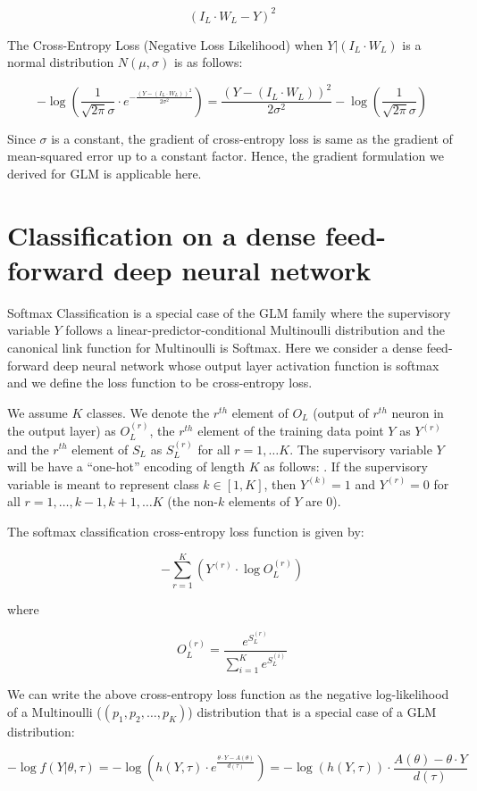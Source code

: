 \documentclass[10pt]{amsart}
\begin{document}
$$(I_L \cdot W_L - Y)^2$$

The Cross-Entropy Loss (Negative Loss Likelihood) when $Y|(I_L \cdot W_L)$ is a normal distribution $N(\mu, \sigma)$ is as follows:

$$ -\log{(\frac {1} {\sqrt{2 \pi} \sigma} \cdot e^{-\frac {(Y - (I_L \cdot W_L))^2} {2 \sigma^2}})} =  \frac {(Y - (I_L \cdot W_L))^2} {2 \sigma^2} - \log{(\frac {1} {\sqrt{2 \pi} \sigma})}$$

Since $\sigma$ is a constant, the gradient of cross-entropy loss is same as the gradient of mean-squared error up to a constant factor. Hence, the gradient formulation we derived for GLM is applicable here.

\section{Classification on a dense feed-forward deep neural network}
Softmax Classification is a special case of the GLM family where the supervisory variable $Y$ follows a linear-predictor-conditional Multinoulli distribution and the canonical link function for Multinoulli is Softmax. Here we consider a dense feed-forward deep neural network whose output layer activation function is softmax and we define the loss function to be cross-entropy loss.

We assume $K$ classes. We denote the $r^{th}$ element of $O_L$ (output of $r^{th}$ neuron in the output layer) as $O_L^{(r)}$, the $r^{th}$ element of the training data point $Y$ as $Y^{(r)}$ and the $r^{th}$ element of $S_L$ as $S_L^{(r)}$ for all $r = 1, \ldots K$. The supervisory variable $Y$ will be have a ``one-hot'' encoding of length $K$ as follows: . If the supervisory variable is meant to represent class $k \in [1, K]$, then $Y^{(k)} = 1$ and $Y^{(r)} = 0$ for all $r = 1, \ldots, k-1, k+1, \ldots K$ (the non-$k$ elements of $Y$ are 0).

The softmax classification cross-entropy loss function is given by:

$$ - \sum_{r=1}^K (Y^{(r)} \cdot \log O_L^{(r)})$$

where

$$O_L^{(r)}  = \frac {e^{S_L^{(r)}}} {\sum_{i=1}^K e^{S_L^{(i)}}}$$

We can write the above cross-entropy loss function as the negative log-likelihood of a Multinoulli ($(p_1, p_2, \ldots, p_K)$) distribution that is a special case of a GLM distribution:

$$ - \log{f(Y | \theta, \tau)} = - \log{(h(Y, \tau) \cdot e^{\frac {\theta \cdot Y - A(\theta)} {d(\tau)}})} = -\log{(h(Y, \tau))} \cdot \frac {A(\theta) - \theta \cdot Y} {d(\tau)}$$
\end{document}
